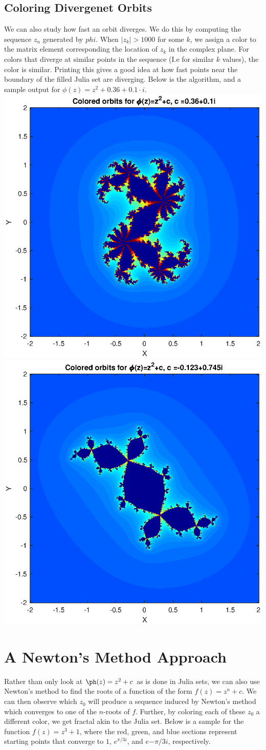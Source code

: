 \documentclass[12pt]{article}
\begin{document}
\subsection{Coloring Divergenet Orbits}
We can also study how fast an orbit diverges. We do this by computing the sequence $z_n$ generated by $phi$. When $|z_k|>1000$ for some $k$, we assign a color to the matrix element corresponding the location of $z_k$ in the complex plane. For colors that diverge at similar points in the sequence (I.e for similar $k$ values), the color is similar. Printing this gives a good idea at how fast points near the boundary of the filled Julia set are diverging. Below is the algorithm, and a sample output for $\phi(z)=z^2+0.36+0.1\cdot i$.\\ 
   \newline
   \noindent \includegraphics [width=0.49\linewidth]{ColorOrbit_3.eps}
   \includegraphics[width=0.49\linewidth]{ColorOrbit_4.eps}
   
    
\section{A Newton's Method Approach}
Rather than only look at $\ph(z)=z^2+c$ as is done in Julia sets, we can also use Newton's method to find the roots of a function of the form $f(z)=z^n+c$. We can then observe which $z_0$ will produce a sequence induced by Newton's method which converges to one of the $n$-roots of $f$. Further, by coloring each of these $z_0$ a different color, we get fractal akin to the Julia set. Below is a sample for the function $f(z)=z^3+1$, where the red, green, and blue sections represent starting points that converge to $1$, $e^{\pi/3 i}$, and $e{-\pi/3i}$, respectively. 
\end{document}
